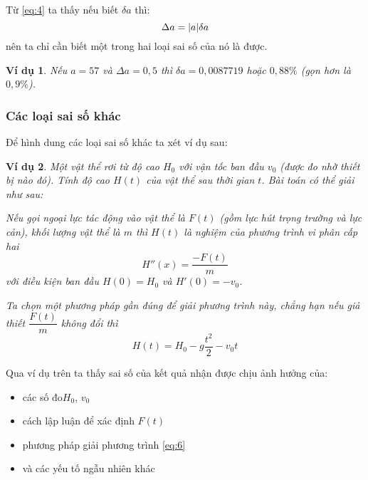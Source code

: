 \documentclass{article}    %
\DeclarePairedDelimiter\abs{\lvert}{\rvert}%
\newtheorem{exmp}{Ví dụ}
\begin{document}
Từ \ref{eq:4} ta thấy nếu biết \(\delta a\) thì:
\begin{equation} \label{eq:5}
    \Delta a = \abs{a}\delta a
\end{equation}
nên ta chỉ cần biết một trong hai loại sai số của nó là được.

\begin{exmp}
    Nếu \(a = 57\) và \(\Delta a = 0,5\) thì \(\delta a = 0,0087719\) hoặc
    \(0,88\%\) (gọn hơn là \(0,9\%\)).
\end{exmp}

\subsubsection{Các loại sai số khác}

Để hình dung các loại sai số khác ta xét ví dụ sau:

\begin{exmp}
    Một vật thể rơi từ độ cao \(H_0\) với vận tốc ban đầu \(v_0\) (được đo nhờ
    thiết bị nào đó). Tính độ cao \(H(t)\) của vật thể sau thời gian \(t\). Bài
    toán có thể giải như sau:

    Nếu gọi ngoại lực tác động vào vật thể là \(F(t)\) (gồm lực hút trọng trường
    và lực cản), khối lượng vật thể là \(m\) thì \(H(t)\) là nghiệm của phương
    trình vi phân cấp hai
    \begin{equation} \label{eq:6}
        H''(x) = \frac{-F(t)}{m}
    \end{equation}
    với điều kiện ban đầu \(H(0) = H_0\) và \(H'(0) = -v_0\).

    Ta chọn một phương pháp gần đúng để giải phương trình này, chẳng hạn nếu giả
    thiết \(\dfrac{F(t)}{m}\) không đổi thì
    \[H(t) = H_0 - g\frac{t^2}{2} -v_0 t\]
\end{exmp}

Qua ví dụ trên ta thấy sai số của kết quả nhận được chịu ảnh hưởng của:
\begin{itemize}
    \item các số đo\(H_0\), \(v_0\)
    \item cách lập luận để xác định \(F(t)\)
    \item phương pháp giải phương trình \ref{eq:6}
    \item và các yếu tố ngẫu nhiên khác
\end{itemize}
\end{document}
